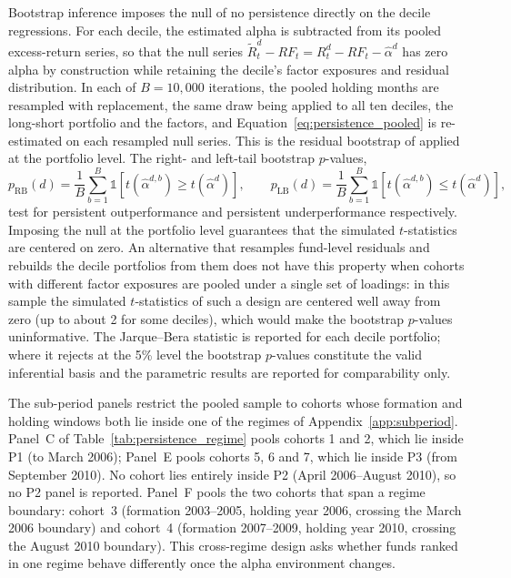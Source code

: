 \documentclass[12pt, oneside]{report}
\renewcommand{\mathrm}[1]{\text{#1}}%
\begin{document}
Bootstrap inference imposes the null of no persistence directly on the
decile regressions. For each decile, the estimated alpha is subtracted
from its pooled excess-return series, so that the null series
$\tilde{R}^d_t - RF_t = R^d_t - RF_t - \hat{\alpha}^d$ has zero alpha by
construction while retaining the decile's factor exposures and residual
distribution. In each of $B = 10{,}000$ iterations, the pooled holding
months are resampled with replacement, the same draw being applied to all
ten deciles, the long-short portfolio and the factors, and
Equation~\ref{eq:persistence_pooled} is re-estimated on each resampled
null series. This is the residual bootstrap of \textcite{FamaFrench2010}
applied at the portfolio level. The right- and left-tail bootstrap
$p$-values,
\begin{equation}
  p_{\mathrm{RB}}(d) = \frac{1}{B}\sum_{b=1}^{B}
    \mathbb{1}\!\left[t(\hat{\alpha}^{d,b}) \geq t(\hat{\alpha}^{d})\right],
  \qquad
  p_{\mathrm{LB}}(d) = \frac{1}{B}\sum_{b=1}^{B}
    \mathbb{1}\!\left[t(\hat{\alpha}^{d,b}) \leq t(\hat{\alpha}^{d})\right],
  \label{eq:boot_pval_persist}
\end{equation}
test for persistent outperformance and persistent underperformance
respectively. Imposing the null at the portfolio level guarantees that
the simulated $t$-statistics are centered on zero. An alternative that
resamples fund-level residuals and rebuilds the decile portfolios from
them does not have this property when cohorts with different factor
exposures are pooled under a single set of loadings: in this sample the
simulated $t$-statistics of such a design are centered well away from
zero (up to about 2 for some deciles), which would make the bootstrap
$p$-values uninformative. The Jarque--Bera statistic is reported for each
decile portfolio; where it rejects at the 5\% level the bootstrap
$p$-values constitute the valid inferential basis and the parametric
results are reported for comparability only.

The sub-period panels restrict the pooled sample to cohorts whose
formation and holding windows both lie inside one of the regimes of
Appendix~\ref{app:subperiod}. Panel~C of Table~\ref{tab:persistence_regime}
pools cohorts 1 and 2, which lie inside P1 (to March 2006); Panel~E pools
cohorts 5, 6 and 7, which lie inside P3 (from September 2010). No cohort
lies entirely inside P2 (April 2006--August 2010), so no P2 panel is
reported. Panel~F pools the two cohorts that span a regime boundary:
cohort~3 (formation 2003--2005, holding year 2006, crossing the March 2006
boundary) and cohort~4 (formation 2007--2009, holding year 2010, crossing
the August 2010 boundary). This cross-regime design asks whether funds
ranked in one regime behave differently once the alpha environment
changes.
\end{document}
